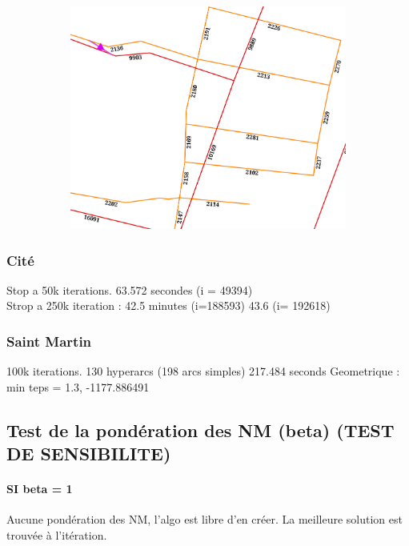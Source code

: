 \documentclass[a4paper,12pt]{article}
\begin{document}
\begin{figure}
  \ContinuedFloat 
  \centering

                \begin{subfigure}[b]{0.5\textheight}
                \includegraphics[width=\textwidth]{./images/illus_graphs/graphe_1_1_greneta_3.png}
				\caption{}
                \label{fig:test}
        \end{subfigure}%
\end{figure}

\subsubsection{Cité}
Stop a 50k iterations. 63.572 secondes (i = 49394)
\\
Strop a 250k iteration : 42.5 minutes (i=188593) 43.6 (i= 192618)

\subsubsection{Saint Martin}
100k iterations.
130 hyperarcs (198 arcs simples)
217.484 seconds
Geometrique : min teps = 1.3,
-1177.886491 


\subsection{Test de la pondération des NM (beta) (TEST DE SENSIBILITE)}
\paragraph{SI beta = 1}
Aucune pondération des NM, l'algo est libre d'en créer. La meilleure solution est trouvée à l'itération.
\end{document}
